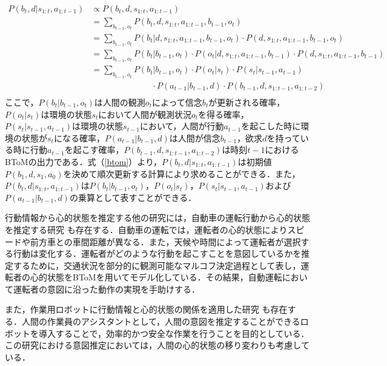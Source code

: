 \begin{equation}
  \begin{split}
  \label{btom}
  P(b_t,d|s_{1:t},a_{1:t-1}) &\propto P(b_t,d,s_{1:t},a_{1:t-1})\\
  &= \sum_{b_{t-1},o_t}P(b_t,d,s_{1:t},a_{1:t-1},b_{t-1},o_t)\\
  &= \sum_{b_{t-1},o_t}P(b_t|d,s_{1:t},a_{1:t-1},b_{t-1},o_t)\cdot P(d,s_{1:t},a_{1:t-1},b_{t-1},o_t)\\
  &= \sum_{b_{t-1},o_t}P(b_t|b_{t-1},o_t)\cdot P(o_t|d,s_{1:t},a_{1:t-1},b_{t-1})\cdot P(d,s_{1:t},a_{1:t-1},b_{t-1})\\
  &= \sum_{b_{t-1},o_t}P(b_t|b_{t-1},o_t)\cdot P(o_t|s_t)\cdot P(s_t|s_{t-1},a_{t-1})\\
  &\hspace{3cm} \cdot P(a_{t-1}|b_{t-1},d)\cdot P(b_{t-1},d,s_{1:t-1},a_{1:t-2})\\
  \end{split}
\end{equation}
ここで，$P(b_t|b_{t-1},o_t)$は人間の観測$o_t$によって信念$b_t$が更新される確率，$P(o_t|s_t)$は環境の状態$s_t$において人間が観測状況$o_t$を得る確率，$P(s_t|s_{t-1},a_{t-1})$は環境の状態$s_{t-1}$において，人間が行動$a_{t-1}$を起こした時に環境の状態が$s_t$になる確率，$P(a_{t-1}|b_{t-1},d)$は人間が信念$b_{t-1}$，欲求$d$を持っている時に行動$a_{t-1}$を起こす確率，$P(b_{t-1},d,s_{1:t-1},a_{1:t-2})$は時刻$t-1$におけるBToMの出力である．式（\ref{btom}）より，$P(b_t,d|s_{1:t},a_{1:t-1})$は初期値$P(b_1,d,s_1,a_0)$を決めて順次更新する計算により求めることができる．また，$P(b_t,d|s_{1:t},a_{1:t-1})$は$P(b_t|b_{t-1},o_t)$，$P(o_t|s_t)$，$P(s_t|s_{t-1},a_{t-1})$および$P(a_{t-1}|b_{t-1},d)$の乗算として表すことができる．


\par
行動情報から心的状態を推定する他の研究には，自動車の運転行動から心的状態を推定する研究 \cite{darwish2020learning}も存在する．自動車の運転では，運転者の心的状態によりスピードや前方車との車間距離が異なる．また，天候や時間によって運転者が選択する行動は変化する．運転者がどのような行動を起こすことを意図しているかを推定するために，交通状況を部分的に観測可能なマルコフ決定過程として表し，運転者の心的状態をBToMを用いてモデル化している．その結果，自動運転において運転者の意図に沿った動作の実現を手助けする．

\par
また，作業用ロボットに行動情報と心的状態の関係を適用した研究 \cite{inbook}も存在する．人間の作業員のアシスタントとして，人間の意図を推定することができるロボットを導入することで，効率的かつ安全な作業を行うことを目的としている．この研究における意図推定においては，人間の心的状態の移り変わりも考慮している．

